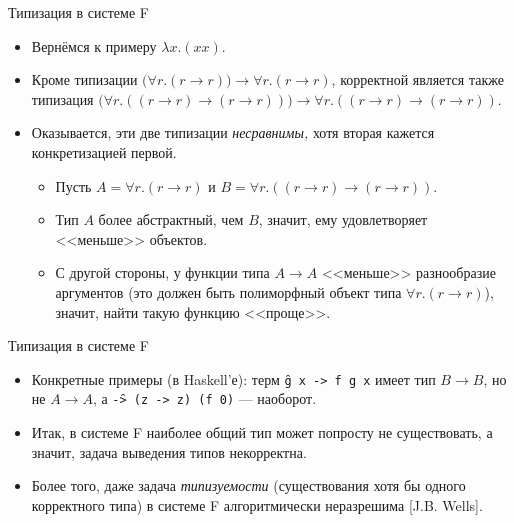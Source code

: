 \documentclass[xcolor=dvipsnames]{beamer}
\begin{document}
\begin{frame}{Типизация в системе F}

\begin{itemize}[<+->]
 \item Вернёмся к примеру $\lambda x. (xx)$.
 \item Кроме типизации $\bigl(\forall r. (r \to r)\bigr) \to \forall r. (r \to r)$, корректной является также типизация $\bigl(\forall r. ((r \to r) \to (r \to r))\bigr) \to \forall r. ((r \to r) \to (r \to r))$.
 
 \item Оказывается, эти две типизации {\em несравнимы,} хотя вторая кажется конкретизацией первой.
 \begin{itemize}
  \item Пусть $A = \forall r. (r \to r)$ и $B = \forall r. ((r \to r) \to (r \to r))$. 
  \item Тип $A$ более абстрактный, чем $B$, значит, ему удовлетворяет <<меньше>> объектов.
  \item С другой стороны, у функции типа $A \to A$ <<меньше>> разнообразие аргументов (это должен быть полиморфный объект типа $\forall r . (r \to r)$), значит, найти такую функцию <<проще>>.
 \end{itemize}

\end{itemize}

 
\end{frame}

\begin{frame}{Типизация в системе F}
 
 \begin{itemize}[<+->]
  \item Конкретные примеры (в Haskell'е):
  терм \texttt{\f g x -> f g x} имеет тип $B \to B$, но не $A \to A$, а 
  \texttt{\f -> (\x z -> z) (f 0)} --- наоборот.
  \item Итак, в системе F наиболее общий тип может попросту не существовать, а значит, задача выведения типов некорректна.
  \item Более того, даже задача {\em типизуемости} (существования хотя бы одного корректного типа) в системе F алгоритмически неразрешима [J.B. Wells].
 \end{itemize}

\end{frame}
\end{document}
